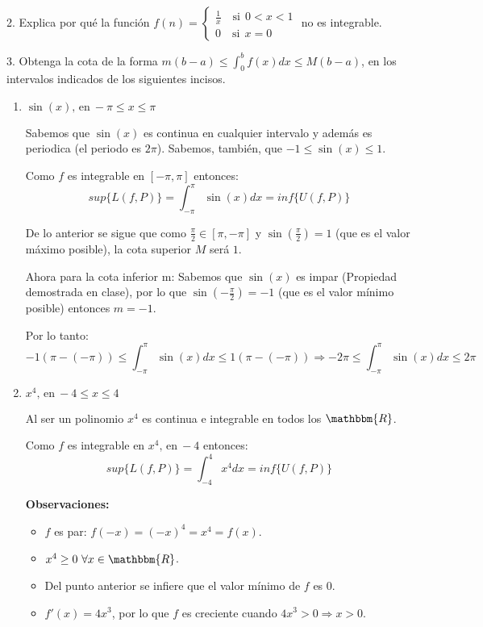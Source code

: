 \documentclass[12pt]{article}
\begin{document}
2. Explica por qu\'e la funci\'on
\(f(n)=
\begin{cases}
    \displaystyle\frac{1}{x} \quad \text{si} \ \ 0<x<1\\
    0 \quad \text{si} \ \ x=0
\end{cases}
\) no es integrable.

3. Obtenga la cota de la forma \(m(b-a) \leq \displaystyle\int_{0}^{b}f(x)dx \leq M(b-a)\), en los intervalos indicados de los siguientes incisos.

\begin{enumerate}[\hspace{9px} a)]
    \item \(\sin(x) \text{, en} \ -\pi \leq x \leq \pi\)\bigskip

        Sabemos que $\sin(x)$ es continua en cualquier intervalo y además es periodica (el periodo es $2\pi$). Sabemos, tambi\'en, que $-1\leq \sin(x)\leq 1$.\bigskip
        
        Como $f$ es integrable en $[-\pi,\pi]$ entonces: \[sup\{L(f,P)\}=\displaystyle\int_{-\pi}^{\pi}\sin(x)dx=inf\{U(f,P)\}\]
        
        De lo anterior se sigue que como \(\displaystyle\frac{\pi}{2}\in[\pi,-\pi]\) y $\sin\left(\displaystyle\frac{\pi}{2}\right)=1$ (que es el valor m\'aximo posible), la cota superior $M$ será $1$.\bigskip
        
        Ahora para la cota inferior m: Sabemos que $\sin(x)$ es impar (Propiedad demostrada en clase), por lo que \(\sin\left(-\displaystyle\frac{\pi}{2}\right)=-1\) (que  es el valor m\'inimo posible) entonces $m=-1$.\bigskip

        Por lo tanto: 
        \[-1(\pi-(-\pi)) \leq \int_{-\pi}^{\pi}\sin(x)dx \leq 1(\pi-(-\pi)) \Rightarrow -2\pi \leq \int_{-\pi}^{\pi}\sin(x)dx \leq 2\pi\]

    \item \(x^4 \text{, en} \ -4 \leq x \leq 4\)\bigskip

        Al ser un polinomio $x^4$ es continua e integrable en todos los $\mathbbm{R}$.\bigskip

        Como $f$ es integrable en \(x^4 \text{, en} \ -4\) entonces:  \[sup\{L(f,P)\}=\displaystyle\int_{-4}^{4}x^4dx=inf\{U(f,P)\}\]

        \textbf{Observaciones:}
        \begin{itemize}
            \item $f$ es par: \(f(-x)=(-x)^4=x^4=f(x)\).
            \item \(x^4\geq0 \ \forall x\in \mathbbm{R}\).
            \item Del punto anterior se infiere que el valor m\'inimo de $f$ es 0.
            \item \(f'(x) = 4x^3\), por lo que $f$ es creciente cuando \(4x^3>0 \Rightarrow x>0\).
        \end{itemize}



\end{enumerate}
\end{document}
